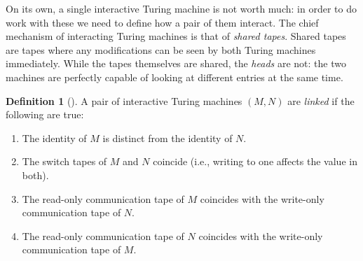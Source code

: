 \documentclass[english,12pt]{reedthesis}
\theoremstyle{plain}
\theoremstyle{definition}
\newtheorem{defn}[defn]{Definition}
\theoremstyle{remark}
\begin{document}
On its own, a single interactive Turing machine is not worth much: in order to
do work with these we need to define how a pair of them interact. The chief
mechanism of interacting Turing machines is that of \emph{shared
  tapes}. Shared tapes are tapes where any modifications can
be seen by both Turing machines immediately. While the tapes themselves are
shared, the \emph{heads} are not: the two machines are perfectly capable of
looking at different entries at the same time.

\begin{defn}[{\cite[Def.\ 4.2.2]{Go01}}]\label{def:linked-tms}
  A pair of interactive Turing machines $(M, N)$ are \emph{linked} if the
  following are true:
  \begin{enumerate}
    \item The identity of $M$ is distinct from the identity of $N$.
    \item The switch tapes of $M$ and $N$ coincide (i.e., writing to one affects
          the value in both).
    \item The read-only communication tape of $M$ coincides with the write-only
          communication tape of $N$.
    \item The read-only communication tape of $N$ coincides with the write-only
          communication tape of $M$.
  \end{enumerate}
\end{defn}
\end{document}
